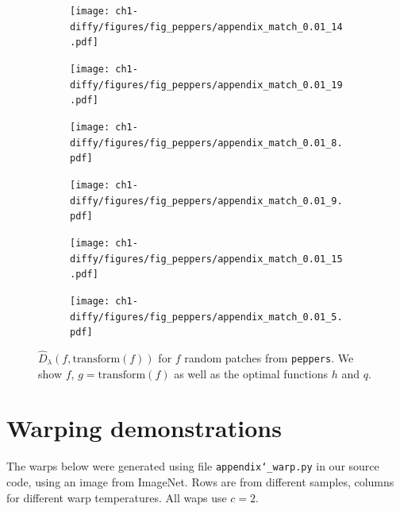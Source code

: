 \begin{figure}[!h]
    \centering
    \begin{subfigure}{0.60\textwidth}
    \texttt{[image: ch1-diffy/figures/fig\_peppers/appendix\_match\_0.01\_14.pdf]}
    \end{subfigure}
    \begin{subfigure}{0.60\textwidth}
    \texttt{[image: ch1-diffy/figures/fig\_peppers/appendix\_match\_0.01\_19.pdf]}
    \end{subfigure}
    \begin{subfigure}{0.60\textwidth}
    \texttt{[image: ch1-diffy/figures/fig\_peppers/appendix\_match\_0.01\_8.pdf]}
    \end{subfigure}
    \begin{subfigure}{0.60\textwidth}
    \texttt{[image: ch1-diffy/figures/fig\_peppers/appendix\_match\_0.01\_9.pdf]}
    \end{subfigure}
    \begin{subfigure}{0.60\textwidth}
    \texttt{[image: ch1-diffy/figures/fig\_peppers/appendix\_match\_0.01\_15.pdf]}
    \end{subfigure}
    \begin{subfigure}{0.60\textwidth}
    \texttt{[image: ch1-diffy/figures/fig\_peppers/appendix\_match\_0.01\_5.pdf]}
    \end{subfigure}
    \caption{$\widehat D_\lambda(f, \textrm{transform}(f))$ for $f$ random patches from \texttt{peppers}. We show $f$, $g=\textrm{transform}(f)$ as well as the optimal functions $h$ and $q$.}
    \label{fig:appendix-peppers-matching}
\end{figure}


\section{Warping demonstrations}\label{sec:appendix-warping}
The warps below were generated using file \texttt{appendix\char`_warp.py} in our source code, using an image from ImageNet. Rows are from different samples, columns for different warp temperatures. All waps use $c=2$.


